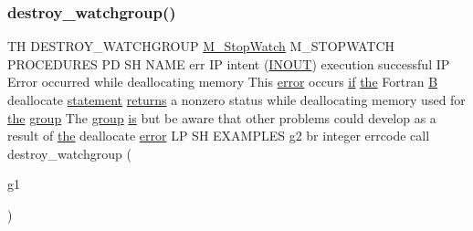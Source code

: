 \subsubsection{\texorpdfstring{destroy\+\_\+watchgroup()}{destroy\_watchgroup()}\hspace{0.1cm}{\footnotesize\ttfamily [2/2]}}
{\footnotesize\ttfamily TH D\+E\+S\+T\+R\+O\+Y\+\_\+\+W\+A\+T\+C\+H\+G\+R\+O\+UP \hyperlink{option__stopwatch_83_8txt_aa2011fc45a5e502e87ee50996a8a9305}{M\+\_\+\+Stop\+Watch} M\+\_\+\+S\+T\+O\+P\+W\+A\+T\+CH P\+R\+O\+C\+E\+D\+U\+R\+ES PD SH N\+A\+ME err IP intent (\hyperlink{M__stopwatch_83_8txt_aac11c70dd588f9c3fe71e95dbe89902f}{I\+N\+O\+UT}) execution successful IP Error occurred while deallocating memory This \hyperlink{M__stopwatch_83_8txt_ac4611edff506351be87ddb9adfc62315}{error} occurs \hyperlink{exit_87_8txt_a77395982f8d25581c808c40f3b634d90}{if} \hyperlink{M__stopwatch_83_8txt_a0f266597de2e57eb3aa964927bb30e14}{the} Fortran \hyperlink{intro__blas1_83_8txt_a5f157716d3fd55e7b7e08312dc859b58}{B} deallocate \hyperlink{M__stopwatch_83_8txt_a43758526aa61bbaa49faf1e287658350}{statement} \hyperlink{M__stopwatch_83_8txt_aee54cdd5349bf498aa96e7f9426a0717}{returns} a nonzero status while deallocating memory used for \hyperlink{M__stopwatch_83_8txt_a0f266597de2e57eb3aa964927bb30e14}{the} \hyperlink{M__stopwatch_83_8txt_a80fa32a76a22835e3c85462b2803875c}{group} The \hyperlink{M__stopwatch_83_8txt_a80fa32a76a22835e3c85462b2803875c}{group} \hyperlink{intro__blas1_83_8txt_a42a91df93f840595de3019ceb5d1df23}{is} but be aware that other problems could develop as a result of \hyperlink{M__stopwatch_83_8txt_a0f266597de2e57eb3aa964927bb30e14}{the} deallocate \hyperlink{M__stopwatch_83_8txt_ac4611edff506351be87ddb9adfc62315}{error} LP SH E\+X\+A\+M\+P\+L\+ES g2 br integer errcode call destroy\+\_\+watchgroup (\begin{DoxyParamCaption}\item[{g1}]{ }\end{DoxyParamCaption})}

\mbox{\label{destroy__watchgroup_83_8txt_afebe2ecc33b5b50e6b6382da3deb8387}} 

